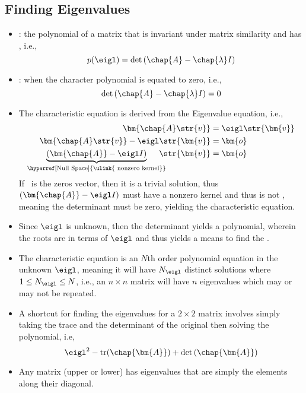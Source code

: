 \begin{itemize}
  \subsection{Finding Eigenvalues}\label{Eigenvalues}
  \begin{itemize}
    \item {}: the polynomial of a matrix that is invariant under matrix similarity and has , i.e.,
    \[%
    p(\eigl) = \det{(\chap{A}-\chap{\lambda} I)}
    \]%
    \item {}: when the character polynomial is equated to zero, i.e.,
    \[%
    \det{(\chap{A}-\chap{\lambda} I)} = 0
    \]%
    \item The characteristic equation is derived from the Eigenvalue equation, i.e.,
    \begin{align*}
      \bm{\chap{A}\str{v}} &= \eigl \str{\bm{v}} \\
      \bm{\chap{A}\str{v}} - \eigl \str{\bm{v}} &= \bm{o} \\
      \underbrace{(\bm{\chap{A}} - \eigl I )}_{\text{\hyperref[Null Space]{\ulink{ nonzero kernel}}}} \hspace{-10pt}\str{\bm{v}} &= \bm{o}
    \end{align*}
    If \eigv~is the zeros vector, then it is a trivial solution, thus \((\bm{\chap{A}} - \eigl I )\) must have a nonzero kernel and thus is not \hyperref[Matrix Inverse]{}, meaning the determinant must be zero, yielding the characteristic equation.
    \item Since \(\eigl \) is unknown, then the determinant yields a polynomial, wherein the roots are in terms of \(\eigl \) and thus yields a means to find the .
    \item The characteristic equation is an \(N\)th order polynomial equation in the unknown \(\eigl \), meaning it will have \(N_{\eigl }\) distinct solutions where \(1 \leq N_{\eigl } \leq N \), i.e.,  an \(n \times n\) matrix will have \(n\) eigenvalues which may or may not be repeated.
    \item A shortcut for finding the eigenvalues for a \(2\times 2\) matrix involves simply taking the trace and the determinant of the original then solving the polynomial, i.e,
    \[%
    \eigl^2 - \operatorname{tr}(\chap{\bm{A}}) + \det{(\chap{\bm{A}})}
    \]%
    \item Any \hyperref[Diagonal and Triagnular Matrices]{} matrix (upper or lower) has eigenvalues that are simply the elements along their diagonal.
  \end{itemize}
    

\end{itemize}
